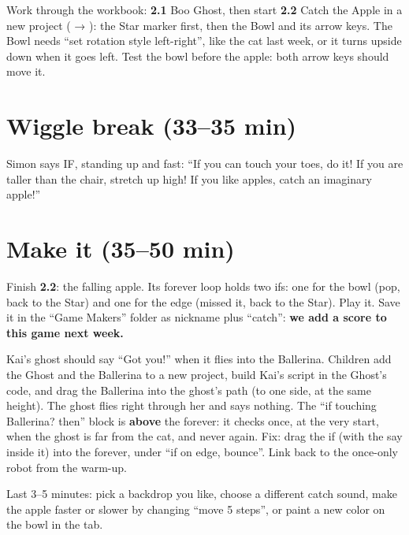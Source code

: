 Work through the workbook: \textbf{2.1} Boo Ghost, then start \textbf{2.2} Catch the Apple in a new project ( → ): the Star marker first, then the Bowl and its arrow keys. The Bowl needs \enquote{set rotation style left-right}, like the cat last week, or it turns upside down when it goes left. Test the bowl before the apple: both arrow keys should move it.

\section{Wiggle break (33--35 min)}
Simon says IF, standing up and fast: \enquote{If you can touch your toes, do it! If you are taller than the chair, stretch up high! If you like apples, catch an imaginary apple!}

\section{Make it (35--50 min)}
Finish \textbf{2.2}: the falling apple. Its forever loop holds two ifs: one for the bowl (pop, back to the Star) and one for the edge (missed it, back to the Star). Play it. Save it in the \enquote{Game Makers} folder as nickname plus \enquote{catch}: \textbf{we add a score to this game next week.}

\begin{bughunt}
Kai's ghost should say \enquote{Got you!} when it flies into the Ballerina. Children add the Ghost and the Ballerina to a new project, build Kai's script in the Ghost's code, and drag the Ballerina into the ghost's path (to one side, at the same height). The ghost flies right through her and says nothing. The \enquote{if touching Ballerina? then} block is \textbf{above} the forever: it checks once, at the very start, when the ghost is far from the cat, and never again. Fix: drag the if (with the say inside it) into the forever, under \enquote{if on edge, bounce}. Link back to the once-only robot from the warm-up.
\end{bughunt}

\begin{freebuild}
Last 3--5 minutes: pick a backdrop you like, choose a different catch sound, make the apple faster or slower by changing \enquote{move 5 steps}, or paint a new color on the bowl in the  tab.
\end{freebuild}

